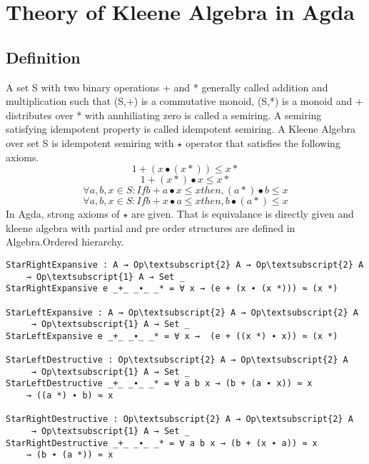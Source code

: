 \chapter{Theory of Kleene Algebra in Agda}
\section{Definition}
A set S with two binary operations + and * generally called addition and multiplication such that (S,+) is a commutative monoid, (S,*) is a monoid and + distributes over * with annhiliating zero is called a semiring. A semiring satisfying idempotent property is called idempotent semiring. A Kleene Algebra over set S is idempotent semiring with \( \star \) operator that satisfies the following axioms.
\begin{equation}\label{eq_starrightexpansive}
1 + (x ∙ (x *)) \leq x *
\end{equation}
\begin{equation}\label{eq_starleftexpansive}
1 + (x *) ∙ x \leq x *
\end{equation}
\begin{equation}\label{eq_starleftdestructive}
\forall a, b, x \in S: If b + a  ∙ x \leq x then, (a *)  ∙ b \leq x
\end{equation}
\begin{equation}\label{eq_starrightdestructive}
\forall a, b, x \in S: If b + x  ∙ a \leq x then, b  ∙ (a *) \leq x
\end{equation}
In Agda, strong axioms of \(\star\) are given. That is equivalance is directly given and kleene algebra with partial and pre order structures are defined in Algebra.Ordered hierarchy. 
\begin{Verbatim}[commandchars=\\\{\},samepage=true]
StarRightExpansive : A → Op\textsubscript{2} A → Op\textsubscript{2} A 
	→ Op\textsubscript{1} A → Set _
StarRightExpansive e _+_ _∙_ _* = ∀ x → (e + (x ∙ (x *))) ≈ (x *)

StarLeftExpansive : A → Op\textsubscript{2} A → Op\textsubscript{2} A
	 → Op\textsubscript{1} A → Set _
StarLeftExpansive e _+_ _∙_ _* = ∀ x →  (e + ((x *) ∙ x)) ≈ (x *)

StarLeftDestructive : Op\textsubscript{2} A → Op\textsubscript{2} A
	 → Op\textsubscript{1} A → Set _
StarLeftDestructive _+_ _∙_ _* = ∀ a b x → (b + (a ∙ x)) ≈ x 
	→ ((a *) ∙ b) ≈ x

StarRightDestructive : Op\textsubscript{2} A → Op\textsubscript{2} A
	 → Op\textsubscript{1} A → Set _
StarRightDestructive _+_ _∙_ _* = ∀ a b x → (b + (x ∙ a)) ≈ x 
	→ (b ∙ (a *)) ≈ x
\end{Verbatim}
